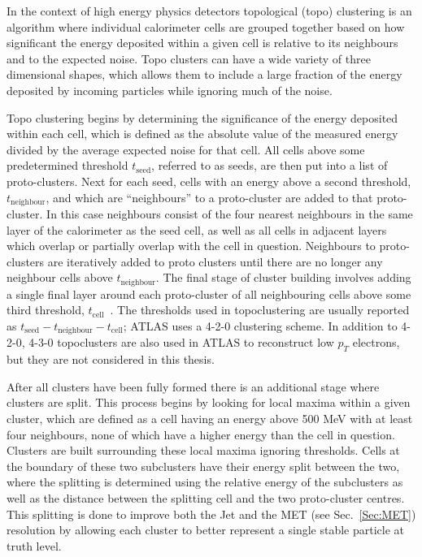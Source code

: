 In the context of high energy physics detectors topological (topo) clustering is an algorithm where individual calorimeter cells are grouped together based on how significant the energy deposited within a given cell is relative to its neighbours and to the expected noise.  
Topo clusters can have a wide variety of three dimensional shapes, which allows them to include a large fraction of the energy deposited by incoming particles while ignoring much of the noise.  

Topo clustering begins by determining the significance of the energy deposited within each cell, which is defined as the absolute value of the measured energy divided by the average expected noise for that cell.  
All cells above some predetermined threshold $t_{\mathrm{seed}}$, referred to as seeds, are then put into a list of proto-clusters.  
Next for each seed, cells with an energy above a second threshold, $t_{\mathrm{neighbour}}$, and which are ``neighbours'' to a proto-cluster are added to that proto-cluster.  
In this case neighbours consist of the four nearest neighbours in the same layer of the calorimeter as the seed cell, as well as all cells in adjacent layers which overlap or partially overlap with the cell in question.  
Neighbours to proto-clusters are iteratively added to proto clusters until there are no longer any neighbour cells above $t_{\mathrm{neighbour}}$.  
The final stage of cluster building involves adding a single final layer around each proto-cluster of all neighbouring cells above some third threshold, $t_{\mathrm{cell}}$~\cite{1603.02934}.  
The thresholds used in topoclustering are usually reported as $t_{\mathrm{seed}}-t_{\mathrm{neighbour}}-t_{\mathrm{cell}}$; ATLAS uses a 4-2-0 clustering scheme.  
In addition to 4-2-0, 4-3-0 topoclusters are also used in ATLAS to reconstruct low $p_T$ electrons, but they are not considered in this thesis.   

After all clusters have been fully formed there is an additional stage where clusters are split.  
This process begins by looking for local maxima within a given cluster, which are defined as a cell having an energy above 500 MeV with at least four neighbours, none of which have a higher energy than the cell in question.  
Clusters are built surrounding these local maxima ignoring thresholds.  
Cells at the boundary of these two subclusters have their energy split between the two, where the splitting is determined using the relative energy of the subclusters as well as the distance between the splitting cell and the two proto-cluster centres.  
This splitting is done to improve both the Jet and the \gls{MET} (see Sec.~\ref{Sec:MET}) resolution by allowing each cluster to better represent a single stable particle at truth level.  

